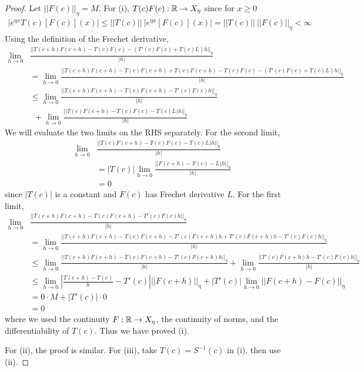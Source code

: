\documentclass[thesis.tex]{subfiles}
\begin{document}
\begin{lemma}
\begin{proof}
Let $||F(c)||_\eta = M$. For (i), $T(c)F(c): \mathbb{R} \rightarrow X_\eta$ since for $x \geq 0$
\begin{align*}
|e^{\eta x} T(c)[F(c)](x)| \leq ||T(c)||\:|e^{\eta x} [F(c)](x)| 
= ||T(c)|| \:||F(c)||_\eta < \infty
\end{align*}
Using the definition of the Frechet derivative,
\begin{align*}
\lim_{h \rightarrow 0}&\frac{||T(c+h)F(c+h) - T(c)F(c) - (T'(c)F(c) + T(c)L)h||_\eta}{|h|} \\
&= \lim_{h \rightarrow 0}\frac{||T(c+h)F(c+h) - T(c)F(c+h) + T(c)F(c+h) - T(c)F(c) - (T'(c)F(c) + T(c)L)h||_\eta}{|h|} \\
&\leq \lim_{h \rightarrow 0}\frac{||T(c+h)F(c+h) - T(c)F(c+h) - T'(c)F(c) h ||_\eta}{|h|} \\
&\:\:+ \lim_{h \rightarrow 0}\frac{||T(c)F(c+h) - T(c)F(c) - T(c)L)h||_\eta}{|h|}
\end{align*}
We will evaluate the two limits on the RHS separately. For the second limit,
\begin{align*}
\lim_{h \rightarrow 0}&\frac{||T(c)F(c+h) - T(c)F(c) - T(c)L)h||_\eta}{|h|} \\
&= |T(c)| \lim_{h \rightarrow 0}\frac{||F(c+h) - F(c) - L)h||_\eta}{|h|} \\
&= 0
\end{align*}
since $|T(c)|$ is a constant and $F(c)$ has Frechet derivative $L$. For the first limit,
\begin{align*}
\lim_{h \rightarrow 0}&\frac{||T(c+h)F(c+h) - T(c)F(c+h) - T'(c)F(c) h ||_\eta}{|h|} \\
&= \lim_{h \rightarrow 0}\frac{||T(c+h)F(c+h) - T(c)F(c+h) - T'(c)F(c+h)h + T'(c)F(c+h)h - T'(c)F(c) h ||_\eta}{|h|} \\
&\leq \lim_{h \rightarrow 0}\frac{||T(c+h)F(c+h) - T(c)F(c+h) - T'(c)F(c+h)h||_\eta}{|h|} + \lim_{h \rightarrow 0} \frac{||T'(c)F(c+h)h - T'(c)F(c) h ||_\eta}{|h|} \\
&\leq \lim_{h \rightarrow 0} \left| \frac{T(c+h) - T(c)}{h} - T'(c) \right| ||F(c+h)||_\eta + |T'(c)| \lim_{h \rightarrow 0} ||F(c+h) - F(c) ||_\eta \\
&= 0 \cdot M + |T'(c)| \cdot 0 \\
&= 0
\end{align*}
where we used the continuity $F: \mathbb{R} \rightarrow X_\eta$, the continuity of norms, and the differentiability of $T(c)$. Thus we have proved (i).

For (ii), the proof is similar. For (iii), take $T(c) = S^{-1}(c)$ in (i), then use (ii).
\end{proof}
\end{lemma}
\end{document}
